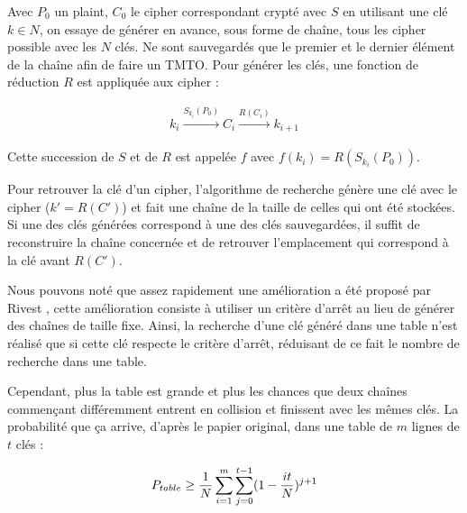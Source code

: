 

		Avec $P_0$ un \gls{plaint}, $C_0$ le \gls{cipher} correspondant crypté avec $S$ en utilisant une clé $k \in N$, on essaye de générer en avance, sous forme de chaîne, tous les \gls{cipher} possible avec les $N$ clés. Ne sont sauvegardés que le premier et le dernier élément de la chaîne afin de faire un \gls{TMTO}. Pour générer les clés, une fonction de réduction $R$ est appliquée aux \gls{cipher} :

		\begin{align*}
			k_i \overset{S_{k_i}(P_0)}{\longrightarrow} C_i \overset{R(C_i)}{\longrightarrow} k_{i+1}
		\end{align*}

		Cette succession de $S$ et de $R$ est appelée $f$ avec $f(k_i) = R(S_{k_i}(P_0))$.

		\bigskip

		Pour retrouver la clé d'un \gls{cipher}, l'algorithme de recherche génère une clé avec le \gls{cipher} ($k' = R(C')$) et fait une chaîne de la taille de celles qui ont été stockées. Si une des clés générées correspond à une des clés sauvegardées, il suffit de reconstruire la chaîne concernée et de retrouver l'emplacement qui correspond à la clé avant $R(C')$.


		Nous pouvons noté que assez rapidement une amélioration a été proposé par Rivest \cite{Rivest}, cette amélioration consiste à utiliser un critère d'arrêt au lieu de générer des chaînes de taille fixe. Ainsi, la recherche d'une clé généré dans une table n'est réalisé que si cette clé respecte le critère d'arrêt, réduisant de ce fait le nombre de recherche dans une table.

		\bigskip

		Cependant, plus la table est grande et plus les chances que deux chaînes commençant différemment entrent en collision et finissent avec les mêmes clés. La probabilité que ça arrive, d'après le papier original\cite{ehellman}, dans une table de $m$ lignes de $t$ clés :

		\bigskip

		\begin{align*}
			P_{table} \ge{} \frac{1}{N} \sum\limits_{i=1}^{m}\sum\limits_{j=0}^{t-1} (1 - \frac{it}{N})^{j+1}
		\end{align*}

		\bigskip

